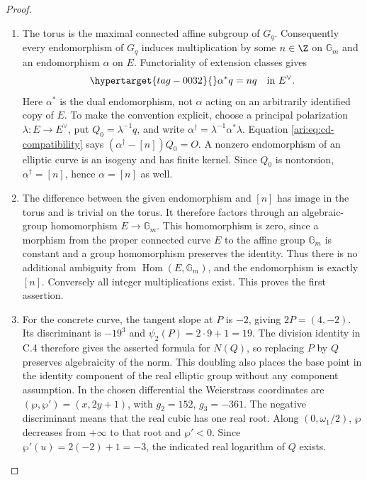 \begin{proof}
\begin{enumerate}[label=\arabic*.,leftmargin=*]
\item The torus is the maximal connected affine subgroup of $G_q$.
Consequently every endomorphism of $G_q$ induces multiplication
by some $n\in\Z$ on $\mathbb G_m$ and an endomorphism
$\alpha$ on $E$. Functoriality of extension classes gives
\begin{equation}\hypertarget{tag-0032}{}\label{ari:eq:cd-compatibility}
 \alpha^*q=nq\quad\text{in }E^\vee.
\end{equation}
Here $\alpha^*$ is the dual endomorphism, not $\alpha$
acting on an arbitrarily identified copy of $E$. To make the
convention explicit, choose a principal polarization
$\lambda:E\to E^\vee$, put $Q_0=\lambda^{-1}q$, and
write $\alpha^\dagger=\lambda^{-1}\alpha^*\lambda$.
Equation \eqref{ari:eq:cd-compatibility} says
$(\alpha^\dagger-[n])Q_0=O$. A nonzero endomorphism of an
elliptic curve is an isogeny and has finite kernel. Since
$Q_0$ is nontorsion, $\alpha^\dagger=[n]$, hence
$\alpha=[n]$ as well.

\item The difference between the given endomorphism and $[n]$ has
image in the torus and is trivial on the torus. It therefore
factors through an algebraic-group homomorphism
$E\to\mathbb G_m$. This homomorphism is zero, since a
morphism from the proper connected curve $E$ to the affine
group $\mathbb G_m$ is constant and a group homomorphism
preserves the identity. Thus there is no additional ambiguity
from $\operatorname{Hom}(E,\mathbb G_m)$, and the
endomorphism is exactly $[n]$. Conversely all integer
multiplications exist. This proves the first assertion.

\item For the concrete curve, the tangent slope at $P$ is $-2$,
giving $2P=(4,-2)$. Its discriminant is $-19^3$ and
$\psi_2(P)=2\cdot9+1=19$. The division identity in C.4
therefore gives the asserted formula for $N(Q)$, so replacing
$P$ by $Q$ preserves algebraicity of the norm. This doubling
also places the base point in the identity component of the
real elliptic group without any component assumption. In the
chosen differential the Weierstrass coordinates are
$(\wp,\wp')=(x,2y+1)$, with $g_2=152$, $g_3=-361$.
The negative discriminant means that the real cubic has one
real root. Along $(0,\omega_1/2)$, $\wp$ decreases from
$+\infty$ to that root and $\wp'<0$. Since
$\wp'(u)=2(-2)+1=-3$, the indicated real logarithm of $Q$
exists.


\end{enumerate}
\end{proof}
